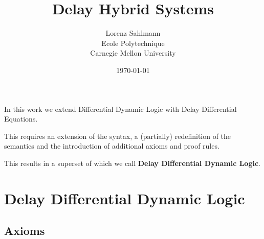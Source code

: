\documentclass[10pt]{report}
\begin{document}
\title{Delay Hybrid Systems}

\author{Lorenz Sahlmann\\ Ecole Polytechnique\\ Carnegie Mellon University}
\date{\today}

\maketitle

In this work we extend Differential Dynamic Logic with Delay Differential Equations.

This requires an extension of the syntax, a (partially) redefinition of the semantics and the introduction of additional axioms and proof rules.

This results in a superset of \dL which we call \textbf{Delay Differential Dynamic Logic}.






%
\section{Delay Differential Dynamic Logic}
    \label{sec:delay-differential-dynamic-logic}

    \subsection{Axioms}
        \label{sec:axioms}



        \begin{calculus}
        \end{calculus}
\end{document}
